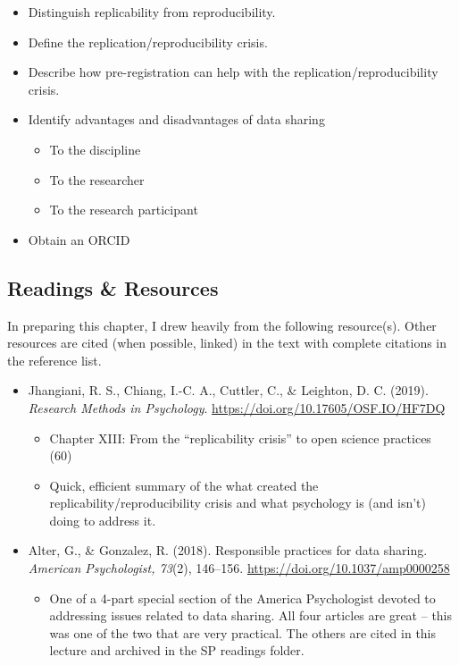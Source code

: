 \documentclass[
  english,
]{book}
\providecommand{\tightlist}{%
  \setlength{\itemsep}{0pt}\setlength{\parskip}{0pt}}
\begin{document}
\begin{itemize}
\tightlist
\item
  Distinguish replicability from reproducibility.
\item
  Define the replication/reproducibility crisis.
\item
  Describe how pre-registration can help with the replication/reproducibility crisis.
\item
  Identify advantages and disadvantages of data sharing

  \begin{itemize}
  \tightlist
  \item
    To the discipline
  \item
    To the researcher
  \item
    To the research participant
  \end{itemize}
\item
  Obtain an ORCID
\end{itemize}

\hypertarget{readings-resources-5}{%
\subsection{Readings \& Resources}\label{readings-resources-5}}

In preparing this chapter, I drew heavily from the following resource(s). Other resources are cited (when possible, linked) in the text with complete citations in the reference list.

\begin{itemize}
\tightlist
\item
  Jhangiani, R. S., Chiang, I.-C. A., Cuttler, C., \& Leighton, D. C. (2019). \emph{Research Methods in Psychology}. \url{https://doi.org/10.17605/OSF.IO/HF7DQ}

  \begin{itemize}
  \tightlist
  \item
    Chapter XIII: From the ``replicability crisis'' to open science practices (60)
  \item
    Quick, efficient summary of the what created the replicability/reproducibility crisis and what psychology is (and isn't) doing to address it.
  \end{itemize}
\item
  Alter, G., \& Gonzalez, R. (2018). Responsible practices for data sharing. \emph{American Psychologist, 73}(2), 146--156. \url{https://doi.org/10.1037/amp0000258}

  \begin{itemize}
  \tightlist
  \item
    One of a 4-part special section of the America Psychologist devoted to addressing issues related to data sharing. All four articles are great -- this was one of the two that are very practical. The others are cited in this lecture and archived in the SP readings folder.
  \end{itemize}
\end{itemize}
\end{document}
